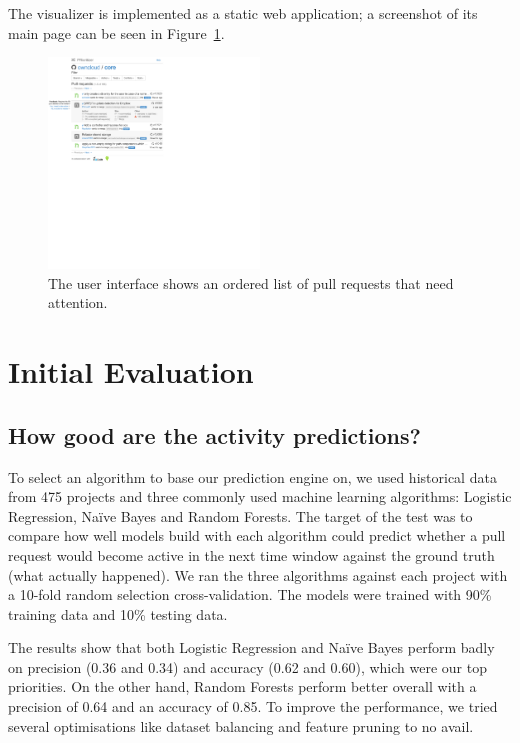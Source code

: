 \documentclass[conference]{IEEEtran}
\begin{document}
The visualizer is implemented as a static web application; a
screenshot of its main page can be seen in Figure~\ref{fig:ui}.

\begin{figure}
  \centering
  \includegraphics[width=0.5\textwidth]{../figs/interface.pdf}
  \caption[The user interface]
  {The user interface shows an ordered list of pull requests that need attention.}
  \label{fig:ui}
  \vspace{-9.5mm}
\end{figure}

\section{Initial Evaluation}
\label{sec:evaluation}

\subsection{How good are the activity predictions?}
\label{sec:learning}

To select an algorithm to base our prediction engine on, we used historical data
from 475 projects and three commonly used machine learning algorithms: Logistic
Regression, Na\"ive Bayes and Random Forests. The target of the test was to
compare how well models build with each algorithm could predict whether a pull
request would become active in the next time window against the ground truth
(what actually happened). We ran the three algorithms against each project with
a 10-fold random selection cross-validation. The models were trained with 90\%
training data and 10\% testing data.

The results show that both Logistic Regression and Na\"ive Bayes perform badly
on precision (0.36 and 0.34) and accuracy (0.62 and 0.60), which were our top
priorities. On the other hand, Random Forests perform better overall with a
precision of 0.64 and an accuracy of 0.85. To improve the performance, we tried
several optimisations like dataset balancing and feature pruning to no avail.
\end{document}
